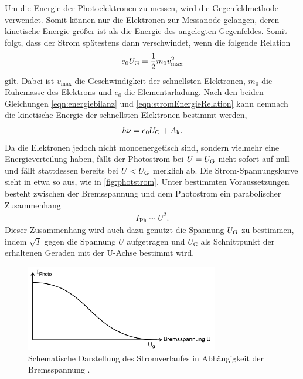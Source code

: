 \noindent
Um die Energie der Photoelektronen zu messen, wird die Gegenfeldmethode verwendet. Somit können nur die Elektronen zur Messanode gelangen, deren kinetische Energie
größer ist als die Energie des angelegten Gegenfeldes. Somit folgt, dass der Strom spätestens dann verschwindet, wenn die folgende Relation 
\begin{align}
    e_0 U_{\text G}=\frac 12 m_0v_{\text{max}}^2
    \label{eqn:stromEnergieRelation}
\end{align}
gilt. Dabei ist $v_{\text{max}}$ die Geschwindigkeit der schnellsten Elektronen, $m_0$ die Ruhemasse des Elektrons und $e_0$ die Elementarladung. Nach den beiden
Gleichungen \eqref{eqn:energiebilanz} und \eqref{eqn:stromEnergieRelation} kann demnach die kinetische Energie der schnellsten Elektronen bestimmt werden,
\begin{align}
    h\nu = e_0 U_{\text G} + A_{\text k}.
    \label{eqn:energieElektr}
\end{align}
Da die Elektronen jedoch nicht monoenergetisch sind, sondern vielmehr eine Energieverteilung haben, fällt der Photostrom bei $U=U_{\text G}$ nicht sofort auf null und fällt
stattdessen bereits bei $U<U_{\text G}$ merklich ab. Die Strom-Spannungskurve sieht in etwa so aus, wie in \autoref{fig:photstrom}. Unter bestimmten Voraussetzungen besteht zwischen der Bremsspannung
und dem Photostrom ein parabolischer Zusammenhang
\begin{align}
    I_{\text{Ph}} \sim U^2.
    \label{eqn:wurzelIGesetz}
\end{align}
Dieser Zusammenhang wird auch dazu genutzt die Spannung $U_{\text G}$ zu bestimmen, indem $\sqrt I$ gegen die Spannung $U$ aufgetragen und $U_{\text{G}}$ 
als Schnittpunkt der erhaltenen Geraden mit der U-Achse bestimmt wird.
\begin{figure}[H]
    \centering
    \includegraphics[width = 0.75\textwidth]{data/Photostrom.png}
    \caption{Schematische Darstellung des Stromverlaufes in Abhängigkeit der Bremsspannung \cite{Anleitung500}.}
    \label{fig:photstrom}
\end{figure}